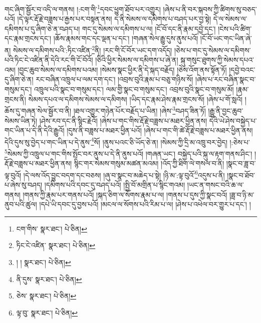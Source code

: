 གང་ཞིག་སྦྱོར་བ་འདི་ལ་གནས། །:ངག་གི་\footnote{ངག་གིས་  སྣར་ཐང་།  པེ་ཅིན། }དབང་ཕྱུག་ཐོབ་པར་འགྱུར། །ཞེས་པ་ནི་བར་སྐབས་ཀྱི་ཚིགས་སུ་བཅད་པའོ། །དེ་ལྟར་རྡོ་རྗེ་བཟླས་པ་རྒྱས་པར་བསྟན་ནས། ད་ནི་སེམས་ལ་དམིགས་པ་བཤད་པར་བྱ་སྟེ། དེ་ལ་སེམས་ལ་དམིགས་པ་དུ་ཞིག་ཅེ་ན་བཤད་པ། གང་དུ་སེམས་ལ་དམིགས་པ་ལ། །ངོ་བོ་དང་ནི་རྣམ་དབྱེ་དང་། །ངེས་པའི་ཚིག་དང་རྣམ་གྲངས་དང་། །ཆོས་རྣམས་གང་དང་ལྡན་པ་དང་། །གཞན་སེལ་རྒྱུ་དུས་ནུས་པའོ། །ངོ་བོ་ཡང་གང་ཡིན་ཞེ་ན། སེམས་ལ་དམིགས་པའི་:ཏིང་འཛིན་\footnote{ཏིང་ངེ་འཛིན་  སྣར་ཐང་།  པེ་ཅིན། }ནི། །རང་གི་ངོ་བོར་ཡང་དག་འདོད། །ཅེས་པ་གང་དུ་སེམས་ལ་དམིགས་པའི་ཏིང་ངེ་འཛིན་ནི་དེའི་རང་གི་ངོ་བོའོ། །ཅིའི་ཕྱིར་སེམས་ལ་དམིགས་པ་ཞེ་ན། སྐུ་གསུང་ཐུགས་ཀྱི་སེམས་དཔའ་འམ། །བྱང་ཆུབ་སེམས་ལ་དམིགས་པའམ། །སེམས་སྣང་ཕྱིར་ནི་དེ་སྐད་བརྗོད། །ཅེས་འོག་ནས་སྟོན་ཏོ། །དབྱེ་བའང་དུ་ཞིག་ཅེ་ན། རང་བཞིན་འཁྲུལ་པ་ལམ་དག་དང་། །འབྲས་བུའི་རྣམ་པ་བཅུ་གཉིས་སོ། །ཞེས་པ་རང་བཞིན་སྣང་བ་གསུམ་དང་། འཁྲུལ་པའི་སྣང་བ་གསུམ་དང་། ལམ་གྱི་སྣང་བ་གསུམ་དང་། འབྲས་བུའི་སྣང་བ་གསུམ་མོ། །རྣམ་གྲངས་ནི། སེམས་དཔའ་ལ་དམིགས་སེམས་ལ་དམིགས། །ཡིད་དང་རྣམ་ཤེས་རྣམ་གྲངས་སོ། །ཞེས་པ་གོ་སླའོ། །ཆོས་དུ་གཞན་སེལ་སྦྱོར་བ་ནི། །ཐལ་འགྱུར་གཉེན་པོར་བརྗོད་པ་ཡིན། །ཞེས་\footnote{། །  སྣར་ཐང་།  པེ་ཅིན། }བཤད་ཟིན་ཏོ། །རྒྱུ་ནི་བྱང་ཆུབ་སེམས་ཡིན་ཏེ། །ཤེས་རབ་དང་ནི་སྙིང་རྗེའོ། །ཞེས་པ་གང་གིས་རྡོ་རྗེ་བཟླས་པ་མཐར་ཕྱིན་ནས། དེའི་ཡེ་ཤེས་བསྐྱེད་པ་གང་ཡིན་པ་དེ་ནི་དེའི་རྒྱུའོ། །དུས་ནི་བཟླས་པ་མཐར་ཕྱིན་པའོ། །ཞེས་པ་གང་གི་ཚེ་རྡོ་རྗེ་བཟླས་པ་མཐར་ཕྱིན་ནས། དེའི་དུས་སུ་བྱེད་པ་གང་ཡིན་པ་དེ་ནུས་\footnote{ནི་དུས་  སྣར་ཐང་།  པེ་ཅིན། }སོ། །ནུས་པའང་ཅི་ཡོད་ཅེ་ན། །སེམས་ཀྱི་དྲི་མ་འཁྲུ་བར་བྱེད། །:ཅེས་པ་\footnote{ཅེས་  སྣར་ཐང་།  པེ་ཅིན། }སེམས་ཀྱི་འཁྲུལ་པ་གང་གིས་སྤོང་བར་ནུས་པ་དེ་ནི་ནུས་པའོ། །གཞན་ཡང་། བསྐྱེད་པའི་སྐུ་ལ་རྟག་གནས་ཤིང་། །རྡོ་རྗེ་བཟླས་པ་མཐར་ཕྱིན་ནས། སྙིང་གར་སེམས་གསུམ་མཚན་མའམ། །འོད་ཀྱི་ཐིག་ལེ་གསལ་བ་ནི། །སྣང་བ་ཟླ་བ་ལྟ་བུའོ། །དེ་ལས་འོད་བྱུང་བདག་དང་བཅས། །ཞུ་བ་སྣང་བ་མཆེད་པ་སྟེ། །ཉི་མ་:ལྟ་བུའོ་\footnote{ལྟ་བུ་  སྣར་ཐང་།  པེ་ཅིན། }འདུས་པ་ནི། །སྣང་བ་ཐོབ་པ་ཞེས་སུ་བཤད། །དམིགས་པའི་དབང་དུ་བཤད་པའོ། །སྤྱི་བོ་མགྲིན་པ་སྙིང་གའམ། །ཡང་ན་གསང་བའི་ཆ་ལ་གནས། །གནས་ཀྱི་རྣམ་པར་གནས་པའོ། །སྐད་ཅིག་ལ་སོགས་རྣམ་པ་ལ། །གནས་པ་དུས་ཀྱི་སྣང་བའོ། །ཟླ་བ་ཉི་མ་ནུབ་པའི་ཚུལ། །དཔེ་ཡི་དབང་དུ་བྱས་པའོ། །མངལ་ལ་སོགས་པའི་རིམ་པ་ལ། །ཤེས་པ་འཕེལ་བར་གྱུར་པ་དང་། །
